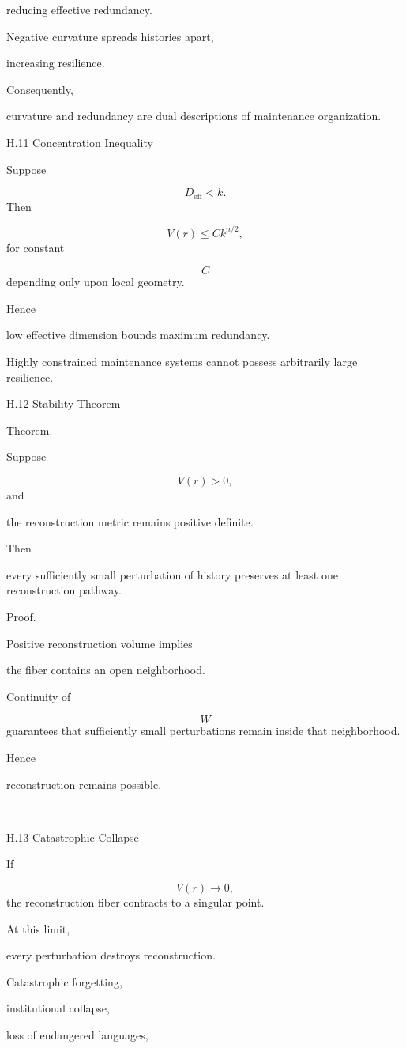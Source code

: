 \documentclass[12pt,oneside]{article}
\theoremstyle{plain}
\theoremstyle{definition}
\theoremstyle{remark}
\begin{document}
reducing effective redundancy.

Negative curvature spreads histories apart,

increasing resilience.

Consequently,

curvature and redundancy are dual descriptions of maintenance organization.


H.11 Concentration Inequality

Suppose

\[
D_{\mathrm{eff}}
<
k.
\]
Then

\[
V(r)
\le
Ck^{n/2},
\]
for constant

\[
C
\]
depending only upon local geometry.

Hence

low effective dimension bounds maximum redundancy.

Highly constrained maintenance systems cannot possess arbitrarily large resilience.


H.12 Stability Theorem

Theorem.

Suppose

\[
V(r)>0,
\]
and

the reconstruction metric remains positive definite.

Then

every sufficiently small perturbation of history preserves at least one reconstruction pathway.

Proof.

Positive reconstruction volume implies

the fiber contains an open neighborhood.

Continuity of

\[
W
\]
guarantees that sufficiently small perturbations remain inside that neighborhood.

Hence

reconstruction remains possible.

\square


H.13 Catastrophic Collapse

If

\[
V(r)
\rightarrow0,
\]
the reconstruction fiber contracts to a singular point.

At this limit,

every perturbation destroys reconstruction.

Catastrophic forgetting,

institutional collapse,

loss of endangered languages,
\end{document}
